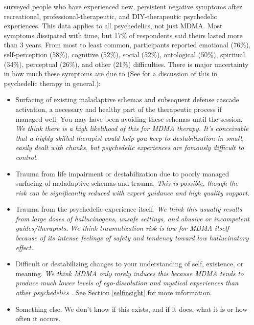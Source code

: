 \documentclass[12pt,letterpaper]{book}
\begin{document}
\textcite{evans2023extended} surveyed people who have experienced new, persistent negative symptoms after recreational, professional-therapeutic, and DIY-therapeutic psychedelic experiences. This data applies to all psychedelics, not just MDMA. Most symptoms dissipated with time, but 17\% of respondents said theirs lasted more than 3 years. From most to least common, participants reported emotional (76\%), self-perception (58\%), cognitive (52\%), social (52\%), ontological (50\%), spiritual (34\%), perceptual (26\%), and other (21\%) difficulties. There is major uncertainty in how much these symptoms are due to (See \textcite{calder2025traumatic} for a discussion of this in psychedelic therapy in general.):
\begin{itemize}
	\item Surfacing of existing maladaptive schemas and subsequent defense cascade activation, a necessary and healthy part of the therapeutic process if managed well. You may have been avoiding these schemas until the session. \textit{We think there is a high likelihood of this for MDMA therapy. It's conceivable that a highly skilled therapist could help you keep to destabilization in small, easily dealt with chunks, but psychedelic experiences are famously difficult to control.}
	\item Trauma from life impairment or destabilization due to poorly managed surfacing of maladaptive schemas and trauma. \textit{This is possible, though the risk can be significantly reduced with expert guidance and high quality support.}
	\item Trauma from the psychedelic experience itself. \textit{We think this usually results from large doses of hallucinogens, unsafe settings, and abusive or incompetent guides/therapists. We think traumatization risk is low for MDMA itself because of its intense feelings of safety and tendency toward low hallucinatory effect.}
	\item Difficult or destabilizing changes to your understanding of self, existence, or meaning. \textit{We think MDMA only rarely induces this because MDMA tends to produce much lower levels of ego-dissolution and mystical experiences than other psychedelics \cite{mdmaExtendedEvans,holze2020distinct}.} See Section \ref{selfinsight} for more information.
	\item Something else. We don't know if this exists, and if it does, what it is or how often it occurs.
\end{itemize}
\end{document}
